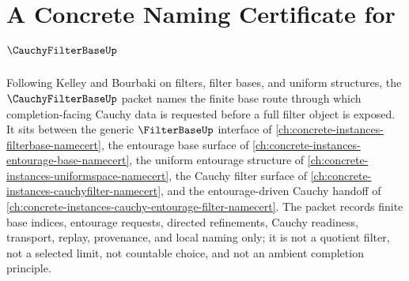 \chapter{A Concrete Naming Certificate for $\CauchyFilterBaseUp$}
\label{ch:concrete-instances-cauchy-filter-base-namecert}

Following Kelley and Bourbaki on filters, filter bases, and uniform structures, the $\CauchyFilterBaseUp$ packet names the finite base route through which completion-facing Cauchy data is requested before a full filter object is exposed. It sits between the generic $\FilterBaseUp$ interface of \autoref{ch:concrete-instances-filterbase-namecert}, the entourage base surface of \autoref{ch:concrete-instances-entourage-base-namecert}, the uniform entourage structure of \autoref{ch:concrete-instances-uniformspace-namecert}, the Cauchy filter surface of \autoref{ch:concrete-instances-cauchyfilter-namecert}, and the entourage-driven Cauchy handoff of \autoref{ch:concrete-instances-cauchy-entourage-filter-namecert}. The packet records finite base indices, entourage requests, directed refinements, Cauchy readiness, transport, replay, provenance, and local naming only; it is not a quotient filter, not a selected limit, not countable choice, and not an ambient completion principle.

